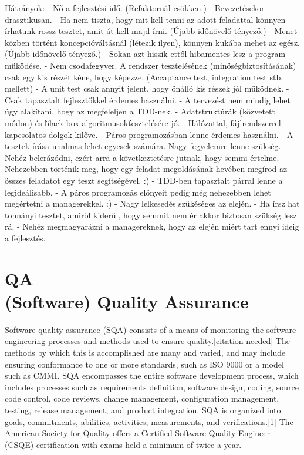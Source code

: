 Hátrányok:
- Nő a fejlesztési idő. (Refaktornál csökken.)
     - Bevezetésekor drasztikusan.
- Ha nem tiszta, hogy mit kell tenni az adott feladattal könnyen írhatunk rossz tesztet, amit át kell majd írni. (Újabb időnövelő tényező.)
- Menet közben történt koncepcióváltásnál (létezik ilyen), könnyen kukába mehet az egész. (Újabb időnövelő tényező.)
- Sokan azt hiszik ettől hibamentes lesz a program működése.
- Nem csodafegyver. A rendszer tesztelésének (minőségbiztosításának) csak egy kis részét kéne, hogy képezze. (Accaptance test, integration test stb. mellett)
- A unit test csak annyit jelent, hogy önálló kis részek jól működnek.
- Csak tapasztalt fejlesztőkkel érdemes használni.
- A tervezést nem mindig lehet úgy alakítani, hogy az megfeleljen a TDD-nek.
     - Adatstruktúrák (közvetett módon) és \"black box algoritmusok\" tesztelésére jó.
     - Hálózattal, fájlrendszerrel kapcsolatos dolgok kilőve.
- Páros programozásban lenne érdemes használni.
     - A tesztek írása unalmas lehet egyesek számára. Nagy fegyelemre lenne szükség.
     - Nehéz belerázódni, ezért arra a következtetésre jutnak, hogy semmi értelme.
     - Nehezebben történik meg, hogy egy feladat megoldásának hevében megírod az összes feladatot egy teszt segítségével. :)
     - TDD-ben tapasztalt párral lenne a legideálisabb.
     - A páros programozás előnyeit pedig még nehezebben lehet megértetni a managerekkel. :)
- Nagy lelkesedés szükéséges az elején.
     - Ha írsz hat tonnányi tesztet, amiről kiderül, hogy semmit nem ér akkor biztosan szükség lesz rá.
- Nehéz megmagyarázni a managereknek, hogy az elején miért tart ennyi ideig a fejlesztés.

\section{QA\\\small{(Software) Quality Assurance}}
Software quality assurance (SQA) consists of a means of monitoring the software engineering processes and methods used to ensure quality.[citation needed] The methods by which this is accomplished are many and varied, and may include ensuring conformance to one or more standards, such as ISO 9000 or a model such as CMMI.
SQA encompasses the entire software development process, which includes processes such as requirements definition, software design, coding, source code control, code reviews, change management, configuration management, testing, release management, and product integration. SQA is organized into goals, commitments, abilities, activities, measurements, and verifications.[1]
The American Society for Quality offers a Certified Software Quality Engineer (CSQE) certification with exams held a minimum of twice a year.

